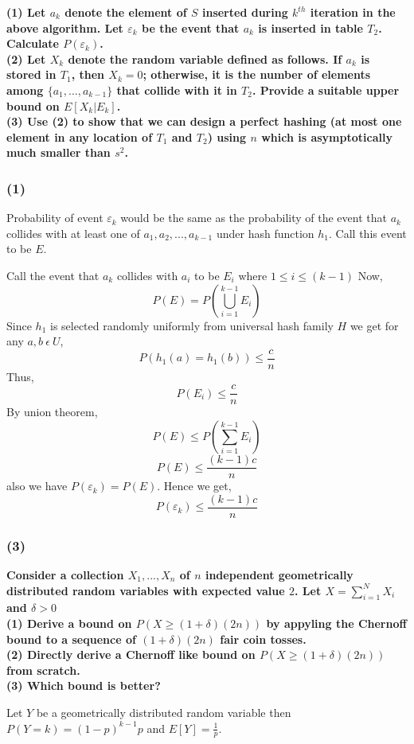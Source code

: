 \documentclass[a4paper]{article}
\begin{document}
\begin{question}[]
\textbf{(1) Let $a_k$ denote the element of $S$ inserted during $k^{th}$ iteration in the above algorithm.
Let $\varepsilon_k$ be the event that $a_k$ is inserted in table $T_2$. Calculate $P(\varepsilon_k)$.\\
(2) Let $X_k$ denote the random variable defined as follows. If $a_k$ is stored in $T_1$, then
$X_k = 0$; otherwise, it is the number of elements among $\{a_1, . . . , a_{k-1}\}$ that collide with it in $T_2$.
Provide a suitable upper bound on $E[X_k | E_k]$.\\
(3)  Use (2) to show that we can design a perfect hashing (at most one element in any
location of $T_1$ and $T_2$) using $n$ which is asymptotically much smaller than $s^2$.}
\end{question}
\subsubsection*{(1)}
    Probability of event $\varepsilon_k$ would be the same as the probability of the event that $a_k$ collides with at least one of $a_1, a_2, ... , a_{k-1}$ under hash function $h_1$. Call this event to be $E$.
    
    Call the event that $a_k$ collides with $a_i$ to be $E_i$ where $1\leq i\leq (k-1)$
    Now, $$P(E) = P(\bigcup_{i=1}^{k-1} E_i)$$
    Since $h_1$ is selected randomly uniformly from universal hash family $H$ we get for any $a,b\ \epsilon\ U$,
    $$P(h_1(a) = h_1(b)) \leq \frac{c}{n}$$
    Thus,
    $$P(E_i) \leq \frac{c}{n}$$
    By union theorem,
    $$P(E) \leq P(\sum_{i=1}^{k-1} E_i)$$
    $$P(E) \leq \frac{(k-1)c}{n}$$
    also we have $P(\varepsilon_k) = P(E)$.
    Hence we get,
    $$P(\varepsilon_k) \leq \frac{(k-1)c}{n}$$

\subsubsection*{(3)}
\pagebreak



\begin{question}[]
\textbf{Consider a collection $X_1, ..., X_n$ of $n$ independent geometrically distributed random variables with expected value $2$. Let $X = \sum_{i=1}^NX_i$ and $\delta > 0$\\
(1) Derive a bound on $P(X \geq (1 + \delta)(2n))$ by appyling the Chernoff bound to a sequence of $(1 + \delta)(2n)$ fair coin tosses.} \\
\textbf{(2) Directly derive a Chernoff like bound on $P(X \geq (1 + \delta)(2n))$ from scratch.} \\
\textbf{(3) Which bound is better?}

\end{question}
Let $Y$ be a geometrically distributed random variable then $P(Y=k) = (1-p)^{k-1}p$ and $E[Y]=\frac{1}{p}$.
\end{document}
